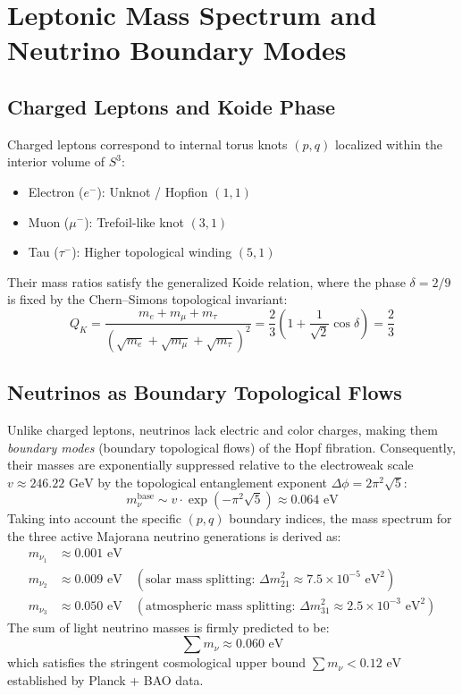 \documentclass[11pt, a4paper]{article}
\begin{document}
\section{Leptonic Mass Spectrum and Neutrino Boundary Modes}

\subsection{Charged Leptons and Koide Phase}
Charged leptons correspond to internal torus knots $(p,q)$ localized within the interior volume of $S^3$:
\begin{itemize}
    \item Electron ($e^-$): Unknot / Hopfion $(1,1)$
    \item Muon ($\mu^-$): Trefoil-like knot $(3,1)$
    \item Tau ($\tau^-$): Higher topological winding $(5,1)$
\end{itemize}
Their mass ratios satisfy the generalized Koide relation, where the phase $\delta = 2/9$ is fixed by the Chern--Simons topological invariant:
\begin{equation}
Q_K = \frac{m_e + m_\mu + m_\tau}{\left(\sqrt{m_e} + \sqrt{m_\mu} + \sqrt{m_\tau}\right)^2} = \frac{2}{3}\left(1 + \frac{1}{\sqrt{2}}\cos\delta\right) = \frac{2}{3}
\end{equation}

\subsection{Neutrinos as Boundary Topological Flows}
Unlike charged leptons, neutrinos lack electric and color charges, making them \textit{boundary modes} (boundary topological flows) of the Hopf fibration. Consequently, their masses are exponentially suppressed relative to the electroweak scale $v \approx 246.22\text{ GeV}$ by the topological entanglement exponent $\Delta\phi = 2\pi^2\sqrt{5}$:
\begin{equation}
m_\nu^{\text{base}} \sim v \cdot \exp\left(-\pi^2\sqrt{5}\right) \approx 0.064\text{ eV}
\end{equation}
Taking into account the specific $(p,q)$ boundary indices, the mass spectrum for the three active Majorana neutrino generations is derived as:
\begin{align}
m_{\nu_1} &\approx 0.001\text{ eV} \\
m_{\nu_2} &\approx 0.009\text{ eV} \quad (\text{solar mass splitting: } \Delta m_{21}^2 \approx 7.5 \times 10^{-5}\text{ eV}^2) \\
m_{\nu_3} &\approx 0.050\text{ eV} \quad (\text{atmospheric mass splitting: } \Delta m_{31}^2 \approx 2.5 \times 10^{-3}\text{ eV}^2)
\end{align}
The sum of light neutrino masses is firmly predicted to be:
\begin{equation}
\sum m_\nu \approx 0.060\text{ eV}
\end{equation}
which satisfies the stringent cosmological upper bound $\sum m_\nu < 0.12\text{ eV}$ established by Planck + BAO data.
\end{document}
